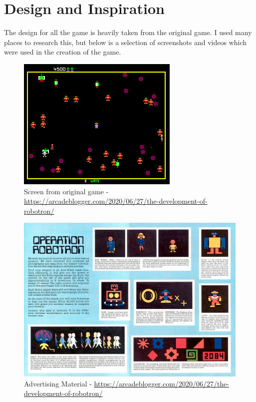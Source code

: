 \documentclass[a4paper, 11pt]{report}
\begin{document}
\section{Design and Inspiration}
The design for all the game is heavily taken from the original game. I used many places to research this, but below is a selection of screenshots and videos which were used in the creation of the game.
\begin{figure}[ht!]
  \includegraphics[width=0.8\linewidth]{design1.png}
  \centering
  \caption{Screen from original game - \url{https://arcadeblogger.com/2020/06/27/the-development-of-robotron/}}
  \label{fig:Design 1}
\end{figure}

\begin{figure}[ht!]
  \includegraphics[width=0.8\linewidth]{design2.png}
  \centering
  \caption{Advertising Material - \url{https://arcadeblogger.com/2020/06/27/the-development-of-robotron/}}
  \label{fig:Design 2}
\end{figure}
\end{document}
